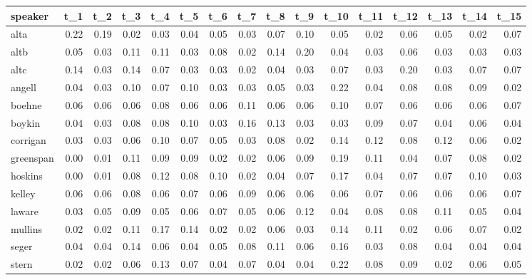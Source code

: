\begin{tabular}{lrrrrrrrrrrrrrrr}
\toprule
   speaker &  t\_1 &  t\_2 &  t\_3 &  t\_4 &  t\_5 &  t\_6 &  t\_7 &  t\_8 &  t\_9 &  t\_10 &  t\_11 &  t\_12 &  t\_13 &  t\_14 &  t\_15 \\
\midrule
      alta & 0.22 & 0.19 & 0.02 & 0.03 & 0.04 & 0.05 & 0.03 & 0.07 & 0.10 &  0.05 &  0.02 &  0.06 &  0.05 &  0.02 &  0.07 \\
      altb & 0.05 & 0.03 & 0.11 & 0.11 & 0.03 & 0.08 & 0.02 & 0.14 & 0.20 &  0.04 &  0.03 &  0.06 &  0.03 &  0.03 &  0.03 \\
      altc & 0.14 & 0.03 & 0.14 & 0.07 & 0.03 & 0.03 & 0.02 & 0.04 & 0.03 &  0.07 &  0.03 &  0.20 &  0.03 &  0.07 &  0.07 \\
    angell & 0.04 & 0.03 & 0.10 & 0.07 & 0.10 & 0.03 & 0.03 & 0.05 & 0.03 &  0.22 &  0.04 &  0.08 &  0.08 &  0.09 &  0.02 \\
    boehne & 0.06 & 0.06 & 0.06 & 0.08 & 0.06 & 0.06 & 0.11 & 0.06 & 0.06 &  0.10 &  0.07 &  0.06 &  0.06 &  0.06 &  0.07 \\
    boykin & 0.04 & 0.03 & 0.08 & 0.08 & 0.10 & 0.03 & 0.16 & 0.13 & 0.03 &  0.03 &  0.09 &  0.07 &  0.04 &  0.06 &  0.04 \\
  corrigan & 0.03 & 0.03 & 0.06 & 0.10 & 0.07 & 0.05 & 0.03 & 0.08 & 0.02 &  0.14 &  0.12 &  0.08 &  0.12 &  0.06 &  0.02 \\
 greenspan & 0.00 & 0.01 & 0.11 & 0.09 & 0.09 & 0.02 & 0.02 & 0.06 & 0.09 &  0.19 &  0.11 &  0.04 &  0.07 &  0.08 &  0.02 \\
   hoskins & 0.00 & 0.01 & 0.08 & 0.12 & 0.08 & 0.10 & 0.02 & 0.04 & 0.07 &  0.17 &  0.04 &  0.07 &  0.07 &  0.10 &  0.03 \\
    kelley & 0.06 & 0.06 & 0.08 & 0.06 & 0.07 & 0.06 & 0.09 & 0.06 & 0.06 &  0.06 &  0.07 &  0.06 &  0.06 &  0.06 &  0.07 \\
    laware & 0.03 & 0.05 & 0.09 & 0.05 & 0.06 & 0.07 & 0.05 & 0.06 & 0.12 &  0.04 &  0.08 &  0.08 &  0.11 &  0.05 &  0.04 \\
   mullins & 0.02 & 0.02 & 0.11 & 0.17 & 0.14 & 0.02 & 0.02 & 0.06 & 0.03 &  0.14 &  0.11 &  0.02 &  0.06 &  0.07 &  0.02 \\
     seger & 0.04 & 0.04 & 0.14 & 0.06 & 0.04 & 0.05 & 0.08 & 0.11 & 0.06 &  0.16 &  0.03 &  0.08 &  0.04 &  0.04 &  0.04 \\
     stern & 0.02 & 0.02 & 0.06 & 0.13 & 0.07 & 0.04 & 0.07 & 0.04 & 0.04 &  0.22 &  0.08 &  0.09 &  0.02 &  0.06 &  0.05 \\
\bottomrule
\end{tabular}

